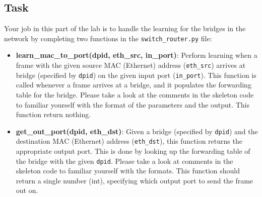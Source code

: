 \documentclass[11pt]{article}
\begin{document}
\subsection{Task}
\label{subsec:logiclearning}
Your job in this part of the lab is to handle the learning for the bridges in the network by completing two functions in the \texttt{switch\_router.py} file:
\begin{itemize}
    \item \textbf{learn\_mac\_to\_port(dpid, eth\_src, in\_port)}: Perform learning when a frame with the given source MAC (Ethernet) address (\texttt{eth\_src}) arrives at bridge (specified by \texttt{dpid}) on the given input port (\texttt{in\_port}). This function is called whenever a frame arrives at a bridge, and it populates the forwarding table for the bridge. Please take a look at the comments in the skeleton code to familiar yourself with the format of the parameters and the output. This function return nothing.

    \item \textbf{get\_out\_port(dpid, eth\_dst)}: Given a bridge (specified by \texttt{dpid}) and the destination MAC (Ethernet) address (\texttt{eth\_dst}), this function returns the appropriate output port. This is done by looking up the forwarding table of the bridge with the given \texttt{dpid}. Please take a look at comments in the skeleton code to familiar yourself with the formats. This function should return a single number (int), specifying which output port to send the frame out on.

\end{itemize}



\end{document}

